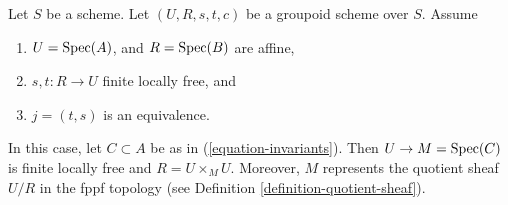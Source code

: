 \begin{proposition}
\label{proposition-finite-flat-equivalence}
Let $S$ be a scheme.
Let $(U, R, s, t, c)$ be a groupoid scheme over $S$.
Assume
\begin{enumerate}
\item $U = \mathop{\rm Spec}(A)$, and $R = \mathop{\rm Spec}(B)$ are affine,
\item $s, t : R \to U$ finite locally free, and
\item $j = (t, s)$ is an equivalence.
\end{enumerate}
In this case, let $C \subset A$ be as in
(\ref{equation-invariants}). Then $U \to M = \mathop{\rm Spec}(C)$
is finite locally free and $R = U \times_M U$.
Moreover, $M$ represents the quotient sheaf $U/R$
in the fppf topology (see Definition \ref{definition-quotient-sheaf}).
\end{proposition}

